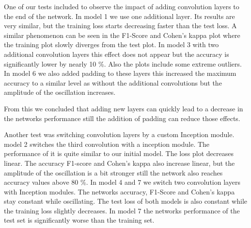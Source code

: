 \documentclass[
a4paper, 
12pt,
grayscalebody, %
abstract=on,
twoside, BCOR10mm, 12pt, DIV13,headinclude, footexclude, final, abstracton, openright
]{ibireprt}
\numberwithin{equation}{chapter}
\numberwithin{table}{chapter}
\numberwithin{figure}{chapter}
\numberwithin{algorithm}{chapter}
\numberwithin{example}{chapter}
\numberwithin{example}{chapter}
\begin{document}
\clearpage

One of our tests included to observe the impact of adding convolution layers to the end of the network. In model 1 we use one additional layer. Its results are very similar, but the training loss starts decreasing faster than the test loss. A similar phenomenon can be seen in the F1-Score and Cohen's kappa plot where the training plot slowly diverges from the test plot. In model 3 with two additional convolution layers this effect does not appear but the accuracy is significantly lower by nearly 10 \%. Also the plots include some extreme outliers. In model 6 we also added padding to these layers this increased the maximum accuracy to a similar level as without the additional convolutions but the amplitude of the oscillation increases.

From this we concluded that adding new layers can quickly lead to a decrease in the networks performance still the addition of padding can reduce those effects. 

\begin{figure}
\end{figure}
Another test was switching convolution layers by a custom Inception module. model 2 switches the third convolution with a inception module. The performance of it is quite similar to our initial model. The loss plot decreases linear. The accuracy F1-score and Cohen's kappa also increase linear, but the amplitude of the oscillation is a bit stronger still the network also reaches accuracy values above 80 \%.
In model 4 and 7 we switch two convolution layers with Inception modules. The networks accuracy, F1-Score and Cohen's kappa stay constant while oscillating. The test loss of both models is also constant while the training loss slightly decreases. In model 7 the networks performance of the test set is significantly worse than the training set.
\end{document}
